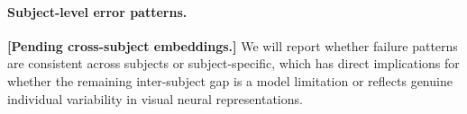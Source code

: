 \paragraph{Subject-level error patterns.}
\textbf{[Pending cross-subject embeddings.]}
We will report whether failure patterns are consistent across subjects or
subject-specific, which has direct implications for whether the remaining
inter-subject gap is a model limitation or reflects genuine individual
variability in visual neural representations.
